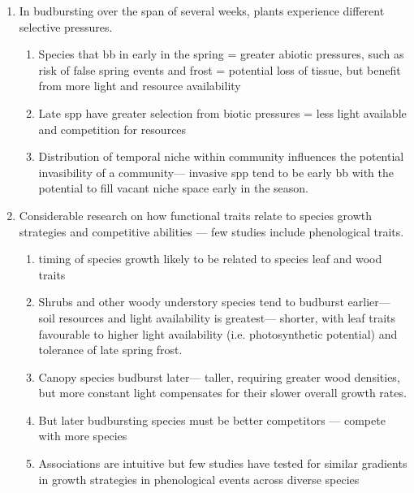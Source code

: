 \documentclass{article}
\begin{document}
\begin{enumerate}
\item In budbursting over the span of several weeks, plants experience different selective pressures.  
\begin{enumerate}
\item Species that bb in early in the spring = greater abiotic pressures, such as risk of false spring events and frost = potential loss of tissue, but benefit from more light and resource availability
\item Late spp have greater selection from biotic pressures = less light available and competition for resources 
\item Distribution of temporal niche within community influences the potential invasibility of a community--- invasive spp tend to be early bb with the potential to fill vacant niche space early in the season. 
\end{enumerate}

\item Considerable research on how functional traits relate to species growth strategies and competitive abilities — few studies include phenological traits.
\begin{enumerate}
\item timing of species growth likely to be related to species leaf and wood traits 
\item Shrubs and other woody understory species tend to budburst earlier--- soil resources and light availability is greatest--- shorter, with leaf traits favourable to higher light availability (i.e. photosynthetic potential) and tolerance of late spring frost.
\item Canopy species budburst later--- taller, requiring greater wood densities, but more constant light compensates for their slower overall growth rates.
\item But later budbursting species must be better competitors --- compete with more species
\item Associations are intuitive but few studies have tested for similar gradients in growth strategies in phenological events across diverse species
\end{enumerate}


\end{enumerate}
\end{document}
